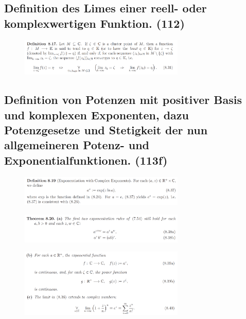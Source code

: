 \subsection{Definition des Limes einer reell- oder komplexwertigen Funktion. (112)}

\begin{figure}[H] \centering
\includegraphics[width=0.7\textwidth]{media/8-21.png}
\end{figure}

\subsection{Definition von Potenzen mit positiver Basis und komplexen Exponenten, dazu Potenzgesetze und Stetigkeit der nun allgemeineren Potenz- und Exponentialfunktionen. (113f)}

\begin{figure}[H] \centering
\includegraphics[width=0.7\textwidth]{media/8-22.png}
\end{figure}
\begin{figure}[H] \centering
\includegraphics[width=0.7\textwidth]{media/8-22-2.png}
\end{figure}
\begin{figure}[H] \centering
\includegraphics[width=0.7\textwidth]{media/8-22-3.png}
\end{figure}